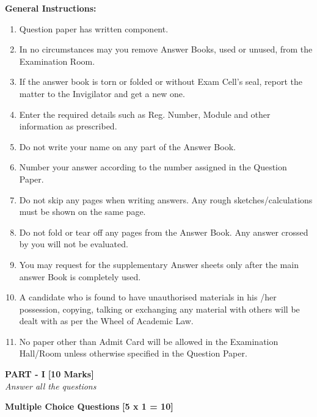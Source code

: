 \documentclass[12pt ,a4paper]{exam}
\begin{document}
	\textbf{General Instructions:}
	\begin{enumerate}
		\itemsep0em 
		\item Question paper has written component.
		\item In no circumstances may you remove Answer Books, used or unused, from the Examination Room.
		\item If the answer book is torn or folded or without Exam Cell’s seal, report the matter to the Invigilator and get a new one.
		\item Enter the required details such as Reg.  Number, Module and other information as prescribed.
		\item Do not write your name on any part of the Answer Book.
		\item Number your answer according to the number assigned in the Question Paper.
		\item Do not skip any pages when writing answers.  Any rough sketches/calculations must be shown on the same page.
		\item Do not fold or tear off any pages from the Answer Book. Any answer crossed by you will not be evaluated.
		\item You may request for the supplementary Answer sheets only after the main answer Book is completely used.
		\item A candidate who is found to have unauthorised materials in his /her possession, copying, talking or exchanging any material with others will be dealt with as per the Wheel of Academic Law.
		\item No paper other than Admit Card will be allowed in the Examination Hall/Room unless otherwise specified in the Question Paper.
	\end{enumerate}
	\pagebreak
	
	\begin{center}
		\noindent \textbf{PART - I} \textbf{ [10 Marks]}\\
		\noindent \textit{Answer all the questions} 
	\end{center}
	
	\vspace{0.5cm}
	
	\noindent \textbf{Multiple Choice Questions} \hfill \textbf{[5 x 1 = 10]}
	
\end{document}
